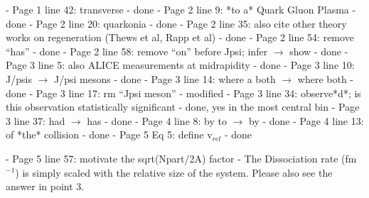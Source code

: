 \documentclass[a4paper,11pt]{article}
\begin{document}
- Page 1 line 42: transverse \newline
- {\color{blue} done} \newline
- Page 2 line 9: *to a* Quark Gluon Plasma \newline 
- {\color{blue} done} \newline
- Page 2 line 20: quarkonia \newline
- {\color{blue} done} \newline
- Page 2 line 35: also cite other theory works on regeneration (Thews et al, Rapp et al) \newline
- {\color{blue} done} \newline
- Page 2 line 54: remove “has” \newline
- {\color{blue} done} \newline
- Page 2 line 58: remove “on” before Jpsi; infer $\rightarrow$ show \newline
- {\color{blue} done} \newline
- Page 3 line 5: also ALICE measurements at midrapidity \newline 
- {\color{blue} done} \newline
- Page 3 line 10: J/psis $\rightarrow$ J/psi mesons \newline
- {\color{blue} done} \newline
- Page 3 line 14: where a both $\rightarrow$ where both \newline
- {\color{blue} done} \newline
- Page 3 line 17: rm “Jpsi meson” \newline
- {\color{blue} modified} \newline
- Page 3 line 34: observe*d*; is this observation statistically significant \newline
- {\color{blue} done, yes in the most central bin}\newline
- Page 3 line 37: had $\rightarrow$ has \newline
- {\color{blue} done}\newline
- Page 4 line 8: by to $\rightarrow$ by \newline
- {\color{blue} done}\newline
- Page 4 line 13: of *the* collision \newline
- {\color{blue} done}\newline
- Page 5 Eq 5: define v$_{rel}$ \newline
- {\color{blue} done}\newline

- Page 5 line 57: motivate the sqrt(Npart/2A) factor \newline
- {\color{blue} The Dissociation rate (fm$^{-1}$) is simply scaled with the relative size of the
  system. Please also see the answer in point 3.}\newline
\end{document}

